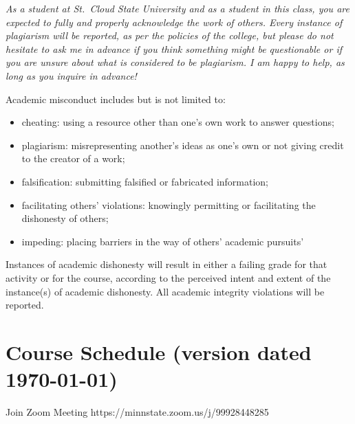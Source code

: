\documentclass{tufte-handout}
\begin{document}
\begin{fullwidth}


\emph{As a student at St.\ Cloud State University and as a student in this class, you are expected to fully and properly acknowledge the work of others. Every instance of plagiarism will be reported, as per the policies of the college, but please do not hesitate to ask me in advance if you think something might be questionable or if you are unsure about what is considered to be plagiarism. I am happy to help, as long as you inquire in advance! }

Academic misconduct includes but is not limited to:

\begin{itemize}
	\item cheating: using a resource other than one's own work to answer questions;
	\item plagiarism: misrepresenting another's ideas as one's own or not giving credit to the creator of a work;
	\item falsification: submitting falsified or fabricated information;
	\item facilitating others' violations: knowingly permitting or facilitating the dishonesty of others;
	\item impeding: placing barriers in the way of others' academic pursuits'
\end{itemize}


Instances of academic dishonesty will result in either a failing grade for that activity or for the course, according to the perceived intent and extent of the instance(s) of academic dishonesty.
All academic integrity violations will be reported.




\newpage

\section{Course Schedule (version dated \today)}

Join Zoom Meeting
https://minnstate.zoom.us/j/99928448285


\end{fullwidth}
\end{document}
